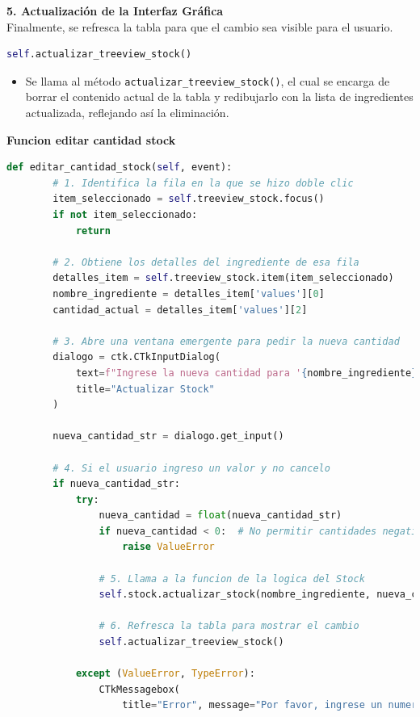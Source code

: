 \documentclass[a4paper,12pt]{article}
\begin{document}
\textbf{5. Actualización de la Interfaz Gráfica}\\
Finalmente, se refresca la tabla para que el cambio sea visible para el usuario.
\begin{lstlisting}[language=Python, caption={desenglosando codigo}, frame=single]
    self.actualizar_treeview_stock()
\end{lstlisting}
\begin{itemize} 
\item Se llama al método \verb|actualizar_treeview_stock()|, el cual se encarga de borrar el contenido actual de la tabla y redibujarlo con la lista de ingredientes actualizada, reflejando así la eliminación. 
\end{itemize}
\textbf{Funcion editar cantidad stock}
\begin{lstlisting}[language=Python, caption={Nuevo codigo}, frame=single]
    def editar_cantidad_stock(self, event):
        # 1. Identifica la fila en la que se hizo doble clic
        item_seleccionado = self.treeview_stock.focus()
        if not item_seleccionado:
            return

        # 2. Obtiene los detalles del ingrediente de esa fila
        detalles_item = self.treeview_stock.item(item_seleccionado)
        nombre_ingrediente = detalles_item['values'][0]
        cantidad_actual = detalles_item['values'][2]

        # 3. Abre una ventana emergente para pedir la nueva cantidad
        dialogo = ctk.CTkInputDialog(
            text=f"Ingrese la nueva cantidad para '{nombre_ingrediente}':",
            title="Actualizar Stock"
        )

        nueva_cantidad_str = dialogo.get_input()

        # 4. Si el usuario ingreso un valor y no cancelo
        if nueva_cantidad_str:
            try:
                nueva_cantidad = float(nueva_cantidad_str)
                if nueva_cantidad < 0:  # No permitir cantidades negativas
                    raise ValueError

                # 5. Llama a la funcion de la logica del Stock
                self.stock.actualizar_stock(nombre_ingrediente, nueva_cantidad)

                # 6. Refresca la tabla para mostrar el cambio
                self.actualizar_treeview_stock()

            except (ValueError, TypeError):
                CTkMessagebox(
                    title="Error", message="Por favor, ingrese un numero valido y positivo.", icon="cancel")
\end{lstlisting}
\end{document}
